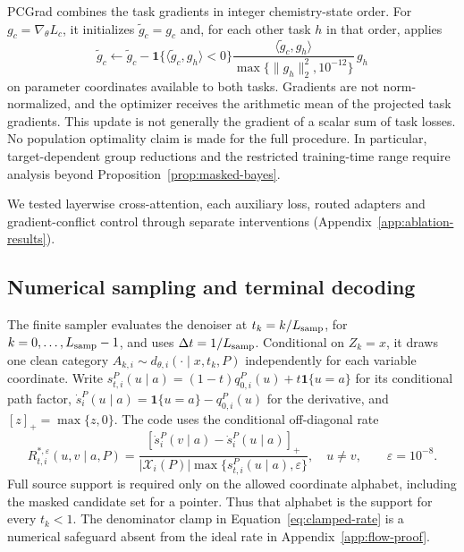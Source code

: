 \documentclass{article}
\theoremstyle{definition}
\begin{document}
PCGrad combines the task gradients in integer chemistry-state order. For
$g_c=\nabla_\theta L_c$, it initializes $\widetilde g_c=g_c$ and, for each other task $h$ in that
order, applies
\begin{equation}
 \widetilde g_c\leftarrow\widetilde g_c-
 \mathbf1\{\langle\widetilde g_c,g_h\rangle<0\}
 \frac{\langle\widetilde g_c,g_h\rangle}{\max\{\|g_h\|_2^2,10^{-12}\}}\,g_h
\end{equation}
on parameter coordinates available to both tasks. Gradients are not norm-normalized, and the
optimizer receives the arithmetic mean of the projected task gradients. This update is not generally
the gradient of a scalar sum of task losses. No population optimality claim is made for the full
procedure. In particular, target-dependent group reductions and the restricted training-time range
require analysis beyond Proposition~\ref{prop:masked-bayes}.

We tested layerwise cross-attention, each auxiliary loss, routed adapters and gradient-conflict
control through separate interventions (Appendix~\ref{app:ablation-results}).

\subsection{Numerical sampling and terminal decoding}
\label{app:sampling}

The finite sampler evaluates the denoiser at $t_k=k/L_{\rm samp}$, for
$k=0,\ldots,L_{\rm samp}-1$, and uses $\Delta t=1/L_{\rm samp}$.
Conditional on $Z_k=x$, it draws one clean category
$A_{k,i}\sim d_{\theta,i}(\cdot\mid x,t_k,P)$ independently for each variable coordinate.
Write $s_{t,i}^P(u\mid a)=(1-t)q_{0,i}^P(u)+t\mathbf1\{u=a\}$ for its conditional path factor,
$\dot s_i^P(u\mid a)=\mathbf1\{u=a\}-q_{0,i}^P(u)$ for the derivative, and
$[z]_+=\max\{z,0\}$. The code uses the conditional off-diagonal rate
\begin{equation}
 R_{t,i}^{*,\varepsilon}(u,v\mid a,P)
 =\frac{[\dot s_i^P(v\mid a)-\dot s_i^P(u\mid a)]_+}
 {|\mathcal X_i(P)|\max\{s_{t,i}^P(u\mid a),\varepsilon\}},
 \quad u\neq v,\qquad \varepsilon=10^{-8}.
 \label{eq:clamped-rate}
\end{equation}
Full source support is required only on the allowed coordinate alphabet, including the masked
candidate set for a pointer. Thus that alphabet is the support for every $t_k<1$.
The denominator clamp in Equation~\ref{eq:clamped-rate} is a numerical safeguard absent from the
ideal rate in Appendix~\ref{app:flow-proof}.
\end{document}
